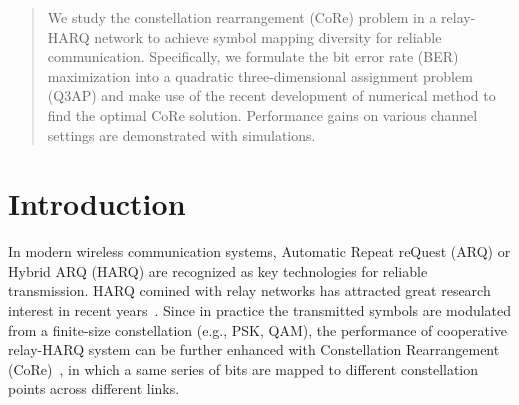 \documentclass[conference]{IEEEtran}
\begin{document}



\maketitle


\begin{abstract}
    We study the constellation rearrangement (CoRe) problem in a relay-HARQ
    network to achieve symbol mapping diversity for reliable communication.
    Specifically, we formulate the bit error rate (BER) maximization into a
    quadratic three-dimensional assignment problem (Q3AP) and make use of the
    recent development of numerical method to find the optimal CoRe solution.
    Performance gains on various channel settings are demonstrated with
    simulations.
\end{abstract}





%
\IEEEpeerreviewmaketitle



\section{Introduction}
In modern wireless communication systems, Automatic Repeat reQuest (ARQ) or
Hybrid ARQ (HARQ) are recognized as key technologies for reliable transmission.
HARQ comined with relay networks has attracted great research interest in recent
years~\cite{ngo2014hybrid}. Since in practice the transmitted symbols are modulated
from a finite-size constellation (e.g., PSK, QAM), the performance of cooperative
relay-HARQ system can be further enhanced with Constellation Rearrangement
(CoRe)~\cite{benelli1992new, wengerter2002advanced}, in which a same series of
bits are mapped to different constellation points across different links.
\end{document}
